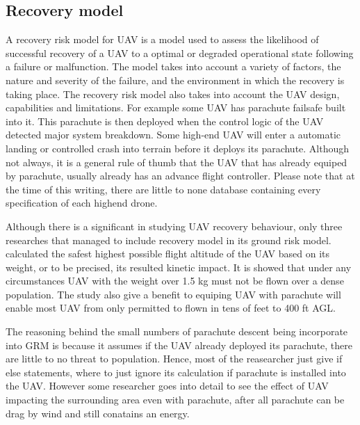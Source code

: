 \documentclass[12pt]{report}
\begin{document}
        \subsection{Recovery model}
            A recovery risk model for UAV is a model used to assess the likelihood of successful recovery of a UAV to a
            optimal or degraded operational state following a failure or malfunction. The model takes into account a
            variety of factors, the nature and severity of the failure, and the environment in which the recovery is
            taking place. The recovery risk model also takes into account the UAV design, capabilities and limitations.
            For example some UAV has parachute failsafe built into it. This parachute is then deployed when the control
            logic of the UAV detected major system breakdown. Some high-end UAV will enter a automatic landing or
            controlled crash into terrain before it deploys its parachute. Although not always, it is a general rule of
            thumb that the UAV that has already equiped by parachute, usually already has an advance flight controller.
            Please note that at the time of this writing, there are little to none database containing every specification
            of each highend drone.
                
            Although there is a significant in studying UAV recovery behaviour, only three researches that managed to
            include recovery model in its ground risk model. \cite{shelley_model_2016} calculated the safest highest
            possible flight altitude of the UAV based on its weight, or to be precised, its resulted kinetic impact. It
            is showed that under any circumstances UAV with the weight over 1.5 kg must not be flown over a dense
            population. The study also give a benefit to equiping UAV with parachute will enable most UAV from only
            permitted to flown in tens of feet to 400 ft \ac{AGL}.

            The reasoning behind the small numbers of parachute descent being incorporate into GRM is because it assumes
            if the UAV already deployed its parachute, there are little to no threat to population. Hence, most of the
            reasearcher just give if else statements, where to just ignore its calculation if parachute is installed
            into the UAV. However some researcher goes into detail to see the effect of UAV impacting the surrounding
            area even with parachute, after all parachute can be drag by wind and still conatains an energy.
\end{document}

